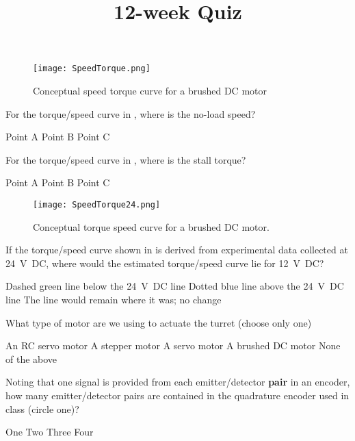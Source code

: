 \documentclass[addpoints,noanswers]{exam}
\title{12-week Quiz}
\author{\usnaInstructorShort}
\date{\printdate{4/1/2020}}
\begin{document}
\maketitle


\begin{figure}[h]
\begin{center}
\texttt{[image: SpeedTorque.png]}
\end{center}
\caption{Conceptual speed torque curve for a brushed DC motor}
\label{fig:1}
\end{figure}


\begin{questions}
\question[1]
For the torque/speed curve in , where is the no-load speed?
\begin{choices}
\choice Point A
\choice Point B
\choice Point C
\end{choices}

\question[1]
For the torque/speed curve in , where is the stall torque?
\begin{choices}
\CorrectChoice Point A
\choice Point B
\choice Point C
\end{choices}

\clearpage
\begin{figure}[ht]
\begin{center}
\texttt{[image: SpeedTorque24.png]}
\end{center}
\caption{Conceptual torque speed curve for a brushed DC motor.}
\label{fig:2}
\end{figure}

\question[1]
If the torque/speed curve shown in  is derived from experimental data collected at \SI{24}{\volt DC}, where would the estimated torque/speed curve lie for \SI{12}{\volt DC}?
\begin{choices}
\CorrectChoice Dashed green line below the \SI{24}{\volt DC} line
\choice Dotted blue line above the \SI{24}{\volt DC} line
\choice The line would remain where it was; no change
\end{choices}

\question[1]
What type of motor are we using to actuate the turret (choose only one)
\begin{choices}
\choice An RC servo motor
\choice A stepper motor
\choice A servo motor
\CorrectChoice A brushed DC motor
\choice None of the above
\end{choices}

\question[1]
Noting that one signal is provided from each emitter/detector \textbf{pair} in an encoder, how many emitter/detector pairs are contained in the quadrature encoder used in class (circle one)?
\begin{choices}
\choice One
\CorrectChoice Two
\choice Three
\choice Four
\end{choices}


\end{questions}
\end{document}
